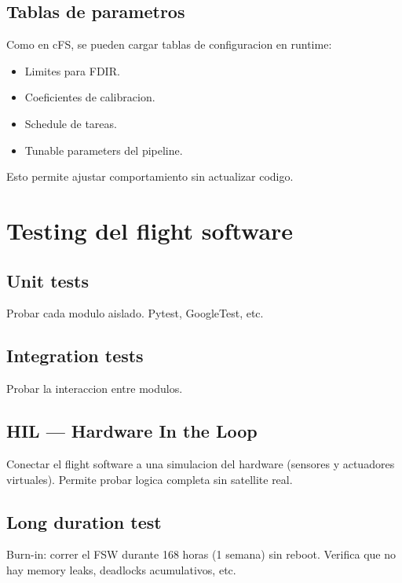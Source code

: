 \documentclass[11pt,a4paper,oneside,openright]{book}
\begin{document}
\section{Tablas de parametros}

Como en cFS, se pueden cargar tablas de configuracion en runtime:

\begin{itemize}[leftmargin=2em]
  \item Limites para FDIR.
  \item Coeficientes de calibracion.
  \item Schedule de tareas.
  \item Tunable parameters del pipeline.
\end{itemize}

Esto permite ajustar comportamiento sin actualizar codigo.

\chapter{Testing del flight software}

\section{Unit tests}

Probar cada modulo aislado. Pytest, GoogleTest, etc.

\section{Integration tests}

Probar la interaccion entre modulos.

\section{HIL --- Hardware In the Loop}

Conectar el flight software a una simulacion del hardware (sensores
y actuadores virtuales). Permite probar logica completa sin satellite
real.

\section{Long duration test}

Burn-in: correr el FSW durante 168 horas (1 semana) sin reboot.
Verifica que no hay memory leaks, deadlocks acumulativos, etc.

\backmatter
\end{document}
